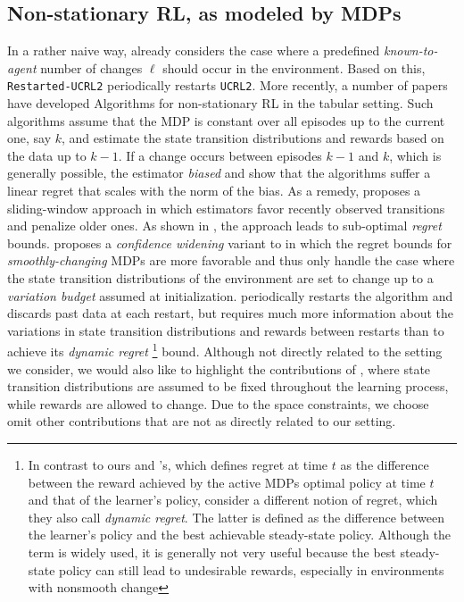\documentclass{article} %
\begin{document}
\subsection{Non-stationary RL, as modeled by MDPs}
In a rather naive way, \cite{UCRL2} already considers the case where a predefined \textit{known-to-agent} number of changes $\ell$ should occur in the environment. Based on this, \texttt{Restarted-UCRL2} periodically restarts \texttt{UCRL2}. More recently, a number of papers have developed \cite{SWUCRL, ortner2020variational, SWUCRL2CW} Algorithms for non-stationary RL in the tabular setting. Such algorithms assume that the MDP is constant over all episodes up to the current one, say $k$, and estimate the state transition distributions and rewards based on the data up to $k-1$. If a change occurs between episodes $k-1$ and $k$, which is generally possible, the estimator \textit{biased} and \cite{ortner2020variational} show that the algorithms suffer a linear regret that scales with the norm of the bias. As a remedy, \cite{SWUCRL, SWUCRL2CW} proposes a sliding-window approach in which estimators favor recently observed transitions and penalize older ones. As shown in \cite{SWUCRL2CW}, the \cite{SWUCRL} approach leads to sub-optimal \textit{regret} bounds.\cite{SWUCRL2CW} proposes a \textit{confidence widening} variant to \cite{SWUCRL} in which the regret bounds for \textit{smoothly-changing} MDPs are more favorable and thus only handle the case where the state transition distributions of the environment are set to change up to a \textit{variation budget} assumed at initialization. \cite{ortner2020variational} periodically restarts the algorithm and discards past data at each restart, but requires much more information about the variations in state transition distributions and rewards between restarts than \cite{SWUCRL2CW} to achieve its \textit{dynamic regret} \footnote{In contrast to ours and \cite{SWUCRL}'s, which defines regret at time $t$ as the difference between the reward achieved by the active MDPs optimal policy at time $t$ and that of the learner's policy, \cite{SWUCRL2CW,ortner2020variational} consider a different notion of regret, which they also call \textit{dynamic regret}. The latter is defined as the difference between the learner's policy and the best achievable steady-state policy. Although the term \cite{yu2009arbitrarily, even2009online, neu2010online, dick2014online} is widely used, it is generally not very useful because the best steady-state policy can still lead to undesirable rewards, especially in environments with nonsmooth change} bound. Although not directly related to the setting we consider, we would also like to highlight the contributions of \cite{yu2009arbitrarily, neu2010online, arora2012deterministic, dick2014online, jin2020learning, rivera2019large}, where state transition distributions are assumed to be fixed throughout the learning process, while rewards are allowed to change. Due to the space constraints, we choose omit other contributions that are not as directly related to our setting.
\vspace{-1em}
\end{document}
